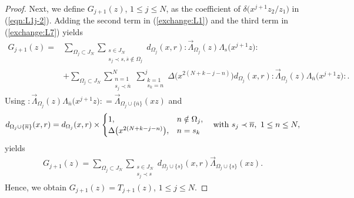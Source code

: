 \documentclass[10pt,a4paper]{amsart}
\numberwithin{equation}{section}
\begin{document}
\begin{proof}
Next, we define
${G}_{j+1}(z)$, $1\leq j \leq N$, as the coefficient of
$\delta\big(x^{j+1}z_2/z_1\big)$ in (\ref{eqn:L1j-2}).
Adding the second term in (\ref{exchange:L1}) and
the third term in (\ref{exchange:L7}) yields
\begin{align*}
{G}_{j+1}(z)=&\sum_{\Omega_j \subset J_N}
\sum\limits_{\substack{s \in J_N\\s_j \prec s, \overline{s} \notin \Omega_j}}
d_{\Omega_{j}}(x,r)
{:}\overrightarrow{\Lambda}_{\Omega_{j}}(z)\Lambda_s\big(x^{j+1}z\big){:}
\\
&+
\sum_{\Omega_j \subset J_N}
\sum\limits_{\substack{n=1\\s_j \prec \overline{n}}}^N
\sum\limits_{\substack{k=1\\s_k=n}}^j
\Delta\big(x^{2(N+k-j-n)}\big) d_{\Omega_{j}}(x,r)
{:}\overrightarrow{\Lambda}_{\Omega_{j}}(z)\Lambda_{\overline{n}}\big(x^{j+1}z\big){:}.
\end{align*}
Using
${:}\overrightarrow{\Lambda}_{\Omega_{j}}(z)\Lambda_{\overline{n}}\big(x^{j+1}z\big){:}
=\overrightarrow{\Lambda}_{\Omega_{j}\cup \{\overline{n}\}}(xz)$
and
\begin{gather*}
d_{{\Omega_{j}\cup \{\overline{n}\}}}(x,r)=
d_{{\Omega_{j}}}(x,r)\times
\begin{cases}
1,& n \notin \Omega_j,\\
\Delta\big(x^{{2(N+k-j-n)}}\big),&n=s_k
\end{cases}\quad
{\rm with}~s_j \prec \overline{n},\ 1\leq n \leq N,
\end{gather*}
yields
\begin{gather*}
{G}_{j+1}(z)=
\sum_{\Omega_j \subset J_N}
\sum\limits_{\substack{s \in J_N
\\s_j \prec s}}d_{\Omega_j\cup \{s\}}(x,r)
\overrightarrow{\Lambda}_{\Omega_j \cup \{s\}}(xz).
\end{gather*}
Hence, we obtain ${G_{j+1}(z)}=T_{j+1}(z)$, $1\leq j \leq N$.


\end{proof}
\end{document}

